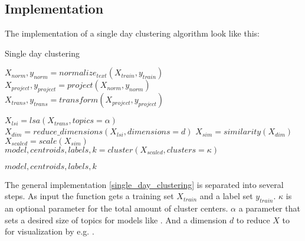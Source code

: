   \subsection{Implementation}
  The implementation of a single day clustering algorithm look like this:

    \begin{algorithm}[H]
    \begin{algorithmic}[1]
      \caption{Single day clustering}\label{single_day_clustering}
        \State $X_{norm},y_{norm} = normalize_{text}(X_{train},y_{train})$
        \State $X_{project},y_{project} = project(X_{norm},y_{norm})$
        \State $X_{trans},y_{trans} = transform(X_{project},y_{project})$

        \State $X_{lsi} = lsa(X_{trans}, topics=\alpha)$
        \State $X_{dim} = reduce\_dimensions(X_{lsi}, dimensions=d)$
        \State $X_{sim} = similarity(X_{dim})$
        \State $X_{scaled} = scale(X_{sim})$
        \State $model,centroids,labels,k = cluster(X_{scaled}, clusters=\kappa)$

        \State \Return $model,centroids,labels,k$
      \EndFunction
    \end{algorithmic}
    \end{algorithm}

  The general implementation \ref{single_day_clustering} is separated into several steps. As input the function gets a training set $X_{train}$ and a label set $y_{train}$. $\kappa$ is an optional parameter for the total amount of cluster centers. $\alpha$ a parameter that sets a desired size of topics for models like \lsa{}. And a dimension $d$ to reduce $X$ to for visualization by e.g. \pca{}.

